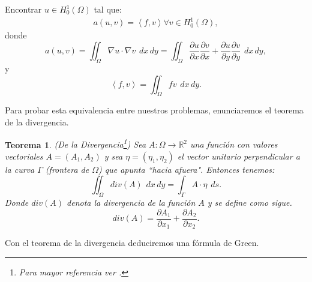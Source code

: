 \documentclass[12pt,spanish,oneside]{book}
\theoremstyle{plain}
\newtheorem{teo}{Teorema}[chapter]
\numberwithin{equation}{chapter}
\theoremstyle{definition}
\theoremstyle{remark}
\newcommand{\re}{\mathbb{R}}
\newcommand{\parc}[2]{\frac{\partial #1}{\partial #2}}
\newcommand{\hcu}{H_0^1}
\newcommand{\dxy}{\hspace{5pt} dx\hspace{2pt} dy }
\newcommand{\ds}{\hspace{5pt} ds}
\begin{document}
Encontrar $u\in \hcu(\Omega)$ tal que:
\begin{align}
a(u,v)=\left<f,v\right> \forall v\in \hcu(\Omega),\label{1.3}
\end{align}
donde
\begin{equation*}
a(u,v)=\iint_\Omega \nabla u\cdot \nabla v \dxy =\iint_\Omega \parc{u}{x} \frac{\partial v}{\partial x}+\frac{\partial u}{\partial y} \frac{\partial v}{\partial y} \dxy,
\end{equation*}
y 
\begin{equation*}
\left<f,v\right>=\iint_\Omega f v\dxy.
\end{equation*}

Para probar esta equivalencia entre nuestros problemas, enunciaremos el teorema de la divergencia.

\begin{teo}{(De la Divergencia\footnote{Para mayor referencia ver \cite{Apostol}.})} Sea $A:\Omega \rightarrow \re^2$ una función con valores vectoriales $A=(A_1,A_2)$ y sea $\eta=(\eta_1,\eta_2)$ el vector unitario perpendicular a la curva $\Gamma$ (frontera de $\Omega$) que apunta ``hacia afuera". Entonces tenemos:
\begin{equation}
\iint_{\Omega} div(A) \dxy = \int_{\Gamma} A\cdot \eta \ds.
\end{equation}
Donde $div(A)$ denota la divergencia de la función $A$ y se define como sigue.
\[div(A) = \frac{\partial A_1}{\partial x_1}+\frac{\partial A_2}{\partial x_2}.\]
\end{teo}

Con el teorema de la divergencia deduciremos una fórmula de Green.
\end{document}
